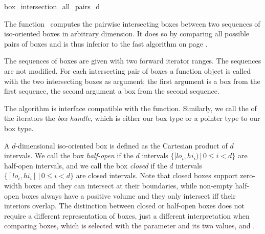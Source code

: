 

\begin{ccRefFunction}{box_intersection_all_pairs_d}

\ccDefinition
  
The function \ccRefName\ computes the pairwise intersecting boxes
between two sequences of iso-oriented boxes in arbitrary dimension.
It does so by comparing all possible pairs of boxes and is thus
inferior to the fast  algorithm on page
\pageref{ccRef_CGAL::box_intersection_d}.

The sequences of boxes are given with two forward iterator ranges. The
sequences are not modified. For each intersecting pair of boxes a
 function object is called with the two intersecting
boxes as argument; the first argument is a box from the first
sequence, the second argument a box from the second sequence.

The algorithm is interface compatible with the
 function. Similarly, we call the
 of the iterators the \emph{box handle}, which is
either our box type or a pointer type to our box type.

A $d$-dimensional iso-oriented box is defined as the Cartesian product
of $d$ intervals. We call the box \emph{half-open} if the $d$
intervals $\{ [lo_i,hi_i) \,|\, 0 \leq i < d\}$ are half-open intervals,
and we call the box \emph{closed} if the $d$ intervals $\{ [lo_i,hi_i]
\,|\, 0 \leq i < d\}$ are closed intervals. Note that closed boxes support
zero-width boxes and they can intersect at their boundaries, while
non-empty half-open boxes always have a positive volume and they only
intersect iff their interiors overlap.  The distinction between closed
or half-open boxes does not require a different representation of
boxes, just a different interpretation when comparing boxes, which is
selected with the  parameter and its two values,
 and
.


\end{ccRefFunction}
